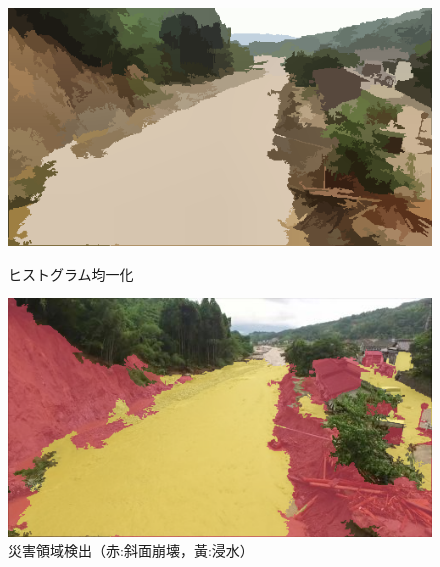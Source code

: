 \documentclass[a4paper, twocolumn, xelatex, 8pt, ja=standard, Ligatures=TeX]{bxjsarticle}
\begin{document}
	\begin{figure}[t]
		\begin{minipage}{0.48\hsize}
			\centering
			\includegraphics[width=\linewidth]{img/equalization.png}
			\caption{ヒストグラム均一化}
			\label{img04}
		\end{minipage}
		\begin{minipage}{0.48\hsize}
			\centering
			\includegraphics[width=\linewidth]{img/detection.png}
			\caption{災害領域検出（赤:斜面崩壊，黃:浸水）}
			\label{img05}
		\end{minipage}
	\end{figure}
\end{document}
